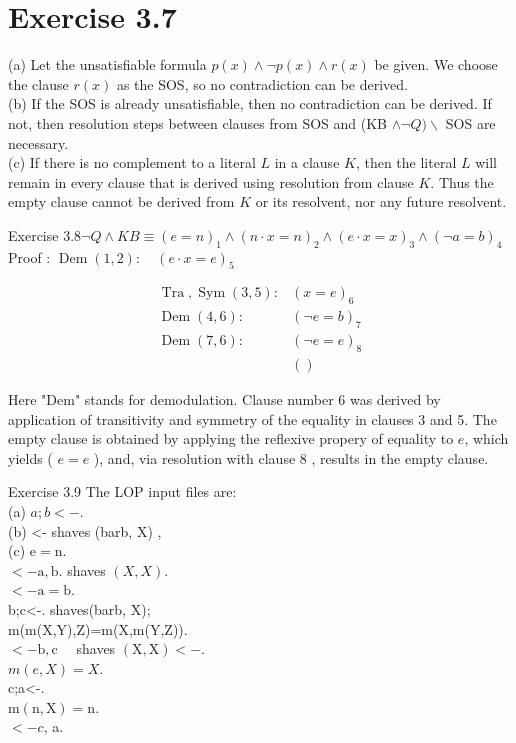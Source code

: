 \documentclass[10pt]{article}
\begin{document}
\section*{Exercise 3.7}
(a) Let the unsatisfiable formula $p(x) \wedge \neg p(x) \wedge r(x)$ be given. We choose the clause $r(x)$ as the SOS, so no contradiction can be derived.\\
(b) If the SOS is already unsatisfiable, then no contradiction can be derived. If not, then resolution steps between clauses from SOS and (KB $\wedge \neg Q) \backslash$ SOS are necessary.\\
(c) If there is no complement to a literal $L$ in a clause $K$, then the literal $L$ will remain in every clause that is derived using resolution from clause $K$. Thus the empty clause cannot be derived from $K$ or its resolvent, nor any future resolvent.

Exercise $3.8 \neg Q \wedge K B \equiv(e=n)_{1} \wedge(n \cdot x=n)_{2} \wedge(e \cdot x=x)_{3} \wedge(\neg a=b)_{4}$\\
Proof : $\operatorname{Dem}(1,2): \quad(e \cdot x=e)_{5}$

$$
\begin{array}{ll}
\operatorname{Tra}, \operatorname{Sym}(3,5): & (x=e)_{6} \\
\operatorname{Dem}(4,6): & (\neg e=b)_{7} \\
\operatorname{Dem}(7,6): & (\neg e=e)_{8} \\
& ()
\end{array}
$$

Here "Dem" stands for demodulation. Clause number 6 was derived by application of transitivity and symmetry of the equality in clauses 3 and 5. The empty clause is obtained by applying the reflexive propery of equality to $e$, which yields ( $e=e$ ), and, via resolution with clause 8 , results in the empty clause.

Exercise 3.9 The LOP input files are:\\
(a) $a ; b<-$.\\
(b) <- shaves (barb, X) ,\\
(c) $\mathrm{e}=\mathrm{n}$.\\
$<-\mathrm{a}, \mathrm{b}$. shaves $(X, X)$.\\
$<-\mathrm{a}=\mathrm{b}$.\\
b;c<-. shaves(barb, X);\\
m(m(X,Y),Z)=m(X,m(Y,Z)).\\
$<-\mathrm{b}, \mathrm{c} \quad$ shaves $(\mathrm{X}, \mathrm{X})<-$.\\
$m(e, X)=X$.\\
c;a<-.\\
$\mathrm{m}(\mathrm{n}, \mathrm{X})=\mathrm{n}$.\\
$<-c$, a.
\end{document}
